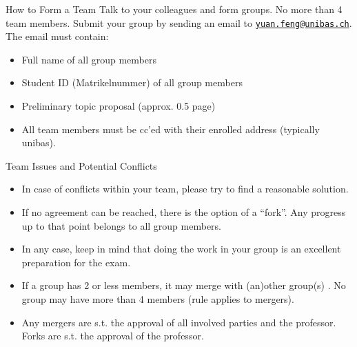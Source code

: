 \documentclass[handout]{beamer}
\begin{document}
\begin{frame}{How to Form a Team}
\label{TEAM}
	Talk to your colleagues and form groups. No more than 4 team members. Submit your group by sending an email to \href{mailto:yuan.feng@unibas.ch?subject=Group\%20SCDF}{\texttt{yuan.feng@unibas.ch}}. The email must contain:
	\begin{itemize}
		\item<2-> Full name of all group members
		\item<3-> Student ID (Matrikelnummer) of all group members
		\item<4-> Preliminary topic proposal (approx. 0.5 page)
		\item<5-> All team members must be cc'ed with their enrolled address (typically unibas).
	\end{itemize}

\vspace{1.5em}
\end{frame}

\begin{frame}{Team Issues and Potential Conflicts}
\begin{itemize}
	\item<1-> In case of conflicts within your team, please try to find a \color{focus} reasonable solution\color{black}. 
	\item<2-> If no agreement can be reached, there is \color{focus} the option of a ``fork''\color{black}. Any progress up to that point belongs to all group members. 
	\item<3-> In any case, keep in mind that doing the work in your group is an \color{focus} excellent preparation for the exam\color{black}. 
	\item<4-> If a group \color{focus} has 2 or less members, it may merge with (an)other group(s) \color{black}. No group may have more than 4 members (rule applies to mergers). 
	\item<5-> Any mergers are \color{focus} s.t. the approval \color{black} of all involved parties and the professor. Forks are s.t. the approval of the professor.
\end{itemize}
\end{frame}
\end{document}
